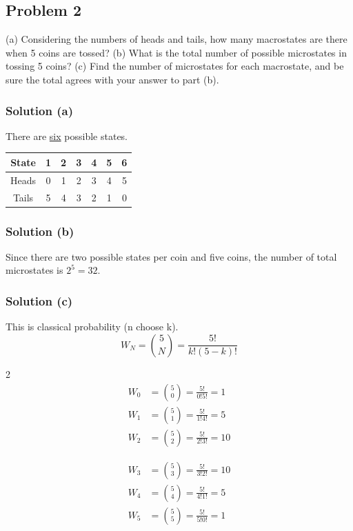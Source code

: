 \documentclass[12pt]{article}
\begin{document}
    \pagebreak
    \subsection{Problem 2}
        (a) Considering the numbers of heads and tails, how many macrostates are there when 5 coins are tossed? 
        (b) What is the total number of possible microstates in tossing 5 coins?
        (c) Find the number of microstates for each macrostate, and be sure the total agrees with your answer to part (b).

        \subsubsection{Solution (a)}
            There are \underline{six} possible states.\\
            \begin{tabular}{| c | c | c | c | c | c | c |}
                \hline
                State   &   1   &   2   &   3   &   4   &   5   &   6\\ \hline
                Heads   &   0   &   1   &   2   &   3   &   4   &   5\\ \hline
                Tails   &   5   &   4   &   3   &   2   &   1   &   0\\
                \hline
            \end{tabular}

        \subsubsection{Solution (b)}
            Since there are two possible states per coin and five coins, the number of total microstates is $2^5 = \boxed{32}$.

        \subsubsection{Solution (c)}
            This is classical probability (n choose k).
            \begin{equation}
                W_N =   \binom{5}{N}    =   \frac{5!}{k!(5-k)!}
            \end{equation}
            \begin{multicols}{2}
                \begin{align}
                    W_0 &=  \binom{5}{0}    =   \frac{5!}{0!5!} =   1\\
                    W_1 &=  \binom{5}{1}    =   \frac{5!}{1!4!} =   5\\
                    W_2 &=  \binom{5}{2}    =   \frac{5!}{2!3!} =   10
                \end{align}

                \begin{align}
                    W_3 &=  \binom{5}{3}    =   \frac{5!}{3!2!} =   10\\
                    W_4 &=  \binom{5}{4}    =   \frac{5!}{4!1!} =   5\\
                    W_5 &=  \binom{5}{5}    =   \frac{5!}{5!0!} =   1
                \end{align}
            \end{multicols}
\end{document}
